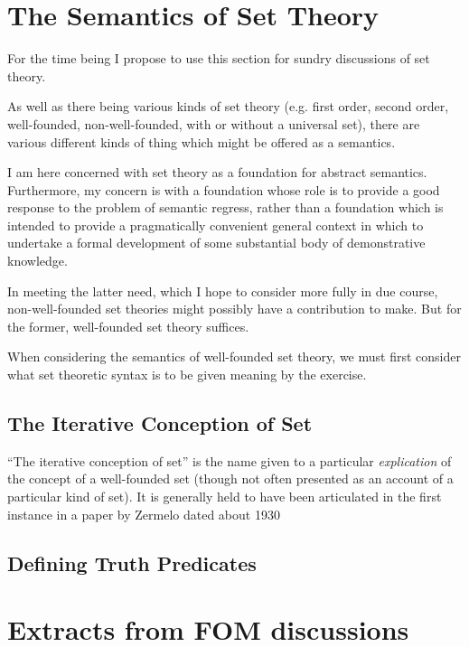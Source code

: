 \documentclass[numreferences]{rbjk}
\begin{document}
\begin{article}
\section{The Semantics of Set Theory}

For the time being I propose to use this section for sundry discussions of set theory.

As well as there being various kinds of set theory (e.g. first order, second order, well-founded, non-well-founded, with or without a universal set), there are various different kinds of thing which might be offered as a semantics.

I am here concerned with set theory as a foundation for abstract semantics.
Furthermore, my concern is with a foundation whose role is to provide a good response to the problem of semantic regress, rather than a foundation which is intended to provide a pragmatically convenient general context in which to undertake a formal development of some substantial body of demonstrative knowledge.

In meeting the latter need, which I hope to consider more fully in due course, non-well-founded set theories might possibly have a contribution to make.
But for the former, well-founded set theory suffices.

When considering the semantics of well-founded set theory, we must first consider what set theoretic syntax is to be given meaning by the exercise.


\subsection{The Iterative Conception of Set}

``The iterative conception of set'' is the name given to a particular {\it explication} of the concept of a well-founded set (though not often presented as an account of a particular kind of set).
It is generally held to have been articulated in the first instance in a paper by Zermelo dated about 1930



\subsection{Defining Truth Predicates}


\appendix

\section{Extracts from FOM discussions}


\end{article}
\end{document}
